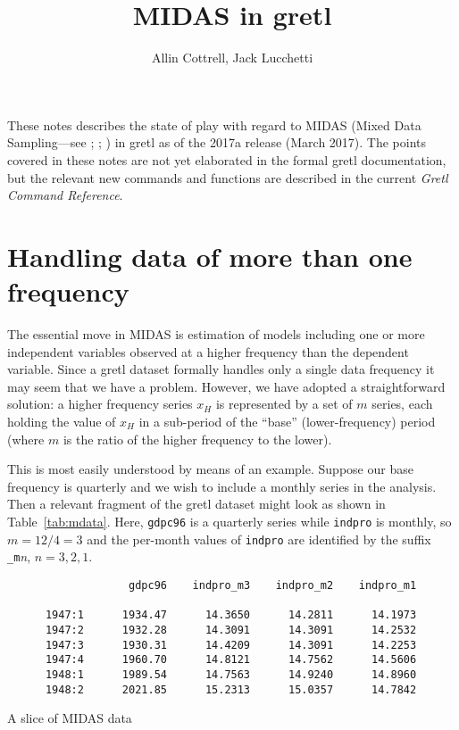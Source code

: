 \documentclass{article}
\begin{document}
\setlength{\parindent}{0pt}
\setlength{\parskip}{1ex}

\title{MIDAS in gretl}
\author{Allin Cottrell, Jack Lucchetti}

\maketitle

These notes describes the state of play with regard to MIDAS (Mixed
Data Sampling---see \citealp{ghysels04}; \citealp{ghysels15};
\citealp{armesto10}) in gretl as of the 2017a release (March
2017). The points covered in these notes are not yet elaborated in the
formal gretl documentation, but the relevant new commands and
functions are described in the current \textit{Gretl Command
  Reference}.

\section{Handling data of more than one frequency}
\label{sec:data-basics}

The essential move in MIDAS is estimation of models including one or
more independent variables observed at a higher frequency than the
dependent variable. Since a gretl dataset formally handles only a
single data frequency it may seem that we have a problem. However, we
have adopted a straightforward solution: a higher frequency series
$x_H$ is represented by a set of $m$ series, each holding the value of
$x_H$ in a sub-period of the ``base'' (lower-frequency) period (where
$m$ is the ratio of the higher frequency to the lower).

This is most easily understood by means of an example. Suppose our
base frequency is quarterly and we wish to include a monthly series in
the analysis. Then a relevant fragment of the gretl dataset might look
as shown in Table~\ref{tab:mdata}. Here, \texttt{gdpc96} is a
quarterly series while \texttt{indpro} is monthly, so $m=12/4=3$ and
the per-month values of \texttt{indpro} are identified by the suffix
\verb|_m|\textit{n}, $n=3,2,1$.

\begin{table}[h]
\small
\begin{verbatim}
                   gdpc96    indpro_m3    indpro_m2    indpro_m1

      1947:1      1934.47      14.3650      14.2811      14.1973
      1947:2      1932.28      14.3091      14.3091      14.2532
      1947:3      1930.31      14.4209      14.3091      14.2253
      1947:4      1960.70      14.8121      14.7562      14.5606
      1948:1      1989.54      14.7563      14.9240      14.8960
      1948:2      2021.85      15.2313      15.0357      14.7842
\end{verbatim}
  \caption{A slice of MIDAS data}
  \label{tab:mdata}
\end{table}
\end{document}

